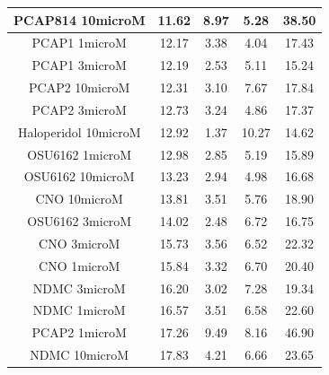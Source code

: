 \documentclass[a4paper,12pt]{article}
\begin{document}
\begin{table}[h!]
\begin{tabular}{|c|c|c|c|c|}
PCAP814 10microM      & 11.62 & 8.97 & 5.28  & 38.50  \\ \hline
PCAP1 1microM         & 12.17 & 3.38 & 4.04  & 17.43 \\ \hline
PCAP1 3microM         & 12.19 & 2.53 & 5.11  & 15.24 \\ \hline
PCAP2 10microM        & 12.31 & 3.10  & 7.67  & 17.84 \\ \hline
PCAP2 3microM         & 12.73 & 3.24 & 4.86  & 17.37 \\ \hline
Haloperidol 10microM  & 12.92 & 1.37 & 10.27 & 14.62 \\ \hline
OSU6162 1microM       & 12.98 & 2.85 & 5.19  & 15.89 \\ \hline
OSU6162 10microM      & 13.23 & 2.94 & 4.98  & 16.68 \\ \hline
CNO 10microM          & 13.81 & 3.51 & 5.76  & 18.90  \\ \hline
OSU6162 3microM       & 14.02 & 2.48 & 6.72  & 16.75 \\ \hline
CNO 3microM           & 15.73 & 3.56 & 6.52  & 22.32 \\ \hline
CNO 1microM           & 15.84 & 3.32 & 6.70   & 20.40  \\ \hline
NDMC 3microM          & 16.20  & 3.02 & 7.28  & 19.34 \\ \hline
NDMC 1microM          & 16.57 & 3.51 & 6.58  & 22.60  \\ \hline
PCAP2 1microM         & 17.26 & 9.49 & 8.16  & 46.90  \\ \hline
NDMC 10microM         & 17.83 & 4.21 & 6.66  & 23.65 \\ \hline
\end{tabular}
\end{table}
\newpage
\end{document}
